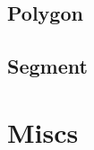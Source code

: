 \subsection{Polygon}
\raggedbottom
\subsection{Segment}
\raggedbottom

\hrulefill


\section{Miscs}
\subsection{}
\raggedbottom

\pagebreak
